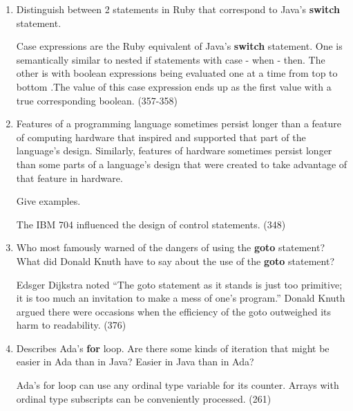 \begin{enumerate}
  \item Distinguish between 2 statements in Ruby
    that correspond to Java's \textbf{switch} statement.

 \begin{answer}
    Case expressions are the Ruby equivalent of Java's \textbf{switch} statement. One is semantically similar to nested if statements with case - when - then. The other is with boolean expressions being evaluated one at a time from top to bottom .The value of this case expression ends up as the first value with a true corresponding boolean. (357-358)
     \end{answer}

  \item Features of a programming language sometimes persist
    longer than a feature of computing hardware that inspired
    and supported that part of the language's design.
    Similarly, features of hardware sometimes persist longer
    than some parts of a language's design that were created
    to take advantage of that feature in hardware.

    Give examples.

 \begin{answer}
    The IBM 704 influenced the design of control statements. (348)
     \end{answer}

  \item Who most famously warned of the dangers of using the
    \textbf{goto} statement? What did Donald Knuth have to
    say about the use of the \textbf{goto} statement?

 \begin{answer}
    Edsger Dijkstra noted “The goto statement as it stands is just too primitive; it is too much an invitation to make a mess of one’s program.” Donald Knuth argued there were occasions when the efficiency of the goto outweighed its harm to readability. (376)
     \end{answer}

  \item Describes Ada's \textbf{for} loop. Are there some
    kinds of iteration that might be easier in Ada than
    in Java? Easier in Java than in Ada?

 \begin{answer}
    Ada’s for loop can use any ordinal type variable for its counter. Arrays with ordinal type subscripts can be conveniently processed. (261)
   \end{answer}
   

\end{enumerate}
